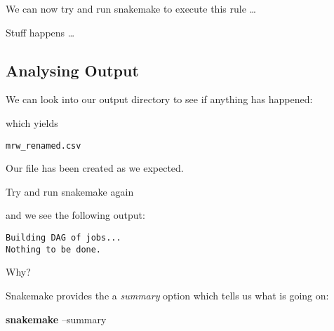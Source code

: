 \documentclass[]{book}
\newenvironment{Shaded}{\begin{snugshade}}{\end{snugshade}}
\newcommand{\KeywordTok}[1]{\textcolor[rgb]{0.13,0.29,0.53}{\textbf{{#1}}}}
\newcommand{\NormalTok}[1]{{#1}}
\theoremstyle{definition}
\theoremstyle{definition}
\theoremstyle{definition}
\theoremstyle{remark}
\begin{document}
We can now try and run snakemake to execute this rule \ldots{}

\begin{Shaded}
\end{Shaded}

Stuff happens \ldots{}

\subsection{Analysing Output}\label{analysing-output}

We can look into our output directory to see if anything has happened:

\begin{Shaded}
\end{Shaded}

which yields

\begin{verbatim}
mrw_renamed.csv
\end{verbatim}

Our file has been created as we expected.

Try and run snakemake again

\begin{Shaded}
\end{Shaded}

and we see the following output:

\begin{verbatim}
Building DAG of jobs...
Nothing to be done.
\end{verbatim}

Why?

Snakemake provides the a \emph{summary} option which tells us what is
going on:

\begin{Shaded}
\begin{Highlighting}[]
\KeywordTok{snakemake} \NormalTok{--summary}
\end{Highlighting}
\end{Shaded}
\end{document}
